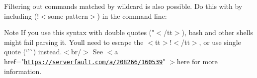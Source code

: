 \begin{DoxyCode}{0}

\end{DoxyCode}


Filtering out commands matched by wildcard is also possible. Do this with by including {\ttfamily (!\texorpdfstring{$<$}{<}some pattern\texorpdfstring{$>$}{>})} in the command line\+:


\begin{DoxyCode}{0}

\end{DoxyCode}


\begin{DoxyNote}{Note}
If you use this syntax with double quotes ({\ttfamily "{}$<$/tt$>$), bash and other shells might fail parsing it. You\textquotesingle{}ll need to escape the $<$tt$>$!$<$/tt$>$, or use single quote (`'\`{}) instead.$<$br/$>$ \+See $<$a href="{}\href{https://serverfault.com/a/208266/160539}{\texttt{https\+://serverfault.\+com/a/208266/160539}}"{} \texorpdfstring{$>$}{>}here for more information. }
\end{DoxyNote}
